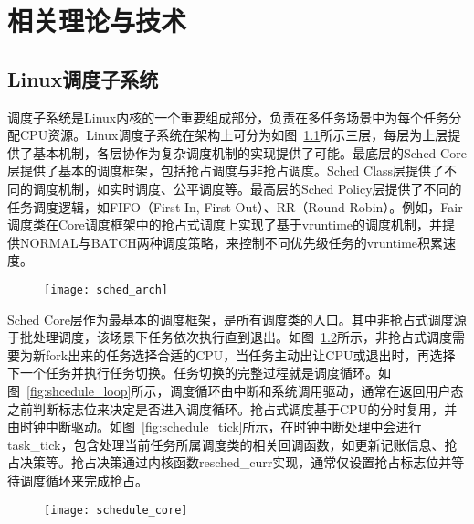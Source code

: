 \chapter{相关理论与技术}\label{chap:theories_tech}

\section{Linux调度子系统}


调度子系统是Linux内核的一个重要组成部分，负责在多任务场景中为每个任务分配CPU资源。Linux调度子系统在架构上可分为如图~\ref{fig:sched_arch}所示三层，每层为上层提供了基本机制，各层协作为复杂调度机制的实现提供了可能。最底层的Sched Core层提供了基本的调度框架，包括抢占调度与非抢占调度。Sched Class层提供了不同的调度机制，如实时调度、公平调度等。最高层的Sched Policy层提供了不同的任务调度逻辑，如FIFO（First In, First Out）、RR（Round Robin）。例如，Fair调度类在Core调度框架中的抢占式调度上实现了基于vruntime的调度机制，并提供NORMAL与BATCH两种调度策略，来控制不同优先级任务的vruntime积累速度。

\begin{figure}[!htbp]
    \centering
    \texttt{[image: sched\_arch]}
    \label{fig:sched_arch}
\end{figure}

Sched Core层作为最基本的调度框架，是所有调度类的入口。其中非抢占式调度源于批处理调度，该场景下任务依次执行直到退出。如图~\ref{fig:schedule_core}所示，非抢占式调度需要为新fork出来的任务选择合适的CPU，当任务主动出让CPU或退出时，再选择下一个任务并执行任务切换。任务切换的完整过程就是调度循环。如图~\ref{fig:shcedule_loop}所示，调度循环由中断和系统调用驱动，通常在返回用户态之前判断标志位来决定是否进入调度循环。抢占式调度基于CPU的分时复用，并由时钟中断驱动。如图~\ref{fig:schedule_tick}所示，在时钟中断处理中会进行task\_tick，包含处理当前任务所属调度类的相关回调函数，如更新记账信息、抢占决策等。抢占决策通过内核函数resched\_curr实现，通常仅设置抢占标志位并等待调度循环来完成抢占。

\begin{figure}[!htbp]
    \centering
    \texttt{[image: schedule\_core]}
    \label{fig:schedule_core}
\end{figure}

